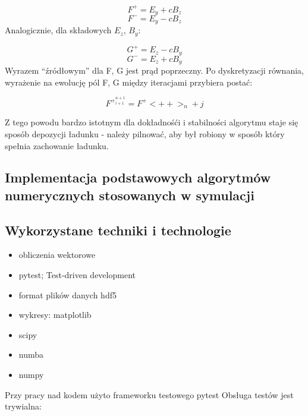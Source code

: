 
\begin{equation}
    F^{+} = E_y + c B_z
\end{equation}
\begin{equation}
    F^{-} = E_y - c B_z
\end{equation}
Analogicznie, dla składowych $E_z$, $B_y$:

\begin{equation}
    G^{+} = E_z - c B_y
\end{equation}
\begin{equation}
    G^{-} = E_z + c B_y
\end{equation}
Wyrazem ``źródłowym'' dla F, G jest prąd poprzeczny. Po dyskretyzacji równania, wyrażenie na ewolucję pól F, G między
iteracjami przybiera postać:

\begin{equation}
    F^{+}^{n+1}_{i+1} = F^{+}<++>_{n} + j%
\end{equation}

Z tego powodu bardzo istotnym dla dokładnośći i stabilności algorytmu staje się sposób depozycji ładunku - należy pilnować,
aby był robiony w sposób który spełnia zachowanie ładunku.

\subsection{Implementacja podstawowych algorytmów numerycznych stosowanych w symulacji}

\subsection{Wykorzystane techniki i technologie}
\begin{itemize}
    \item obliczenia wektorowe
    \item pytest; Test-driven development
    \item format plików danych hdf5
    \item wykresy: matplotlib
    \item scipy
    \item numba
    \item numpy
\end{itemize}

Przy pracy nad kodem użyto frameworku testowego pytest %
Obsługa testów jest trywialna:

